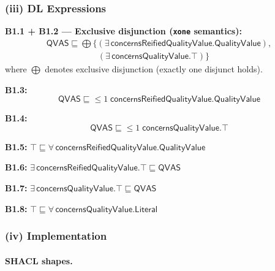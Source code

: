 \documentclass[12pt,a4paper]{article}
\begin{document}
\subsubsection*{(iii) DL Expressions}

\textbf{B1.1 + B1.2 --- Exclusive disjunction (\texttt{xone} semantics):}
\begin{multline*}
  \mathsf{QVAS} \sqsubseteq
  \bigoplus\bigl\{
    (\exists\,\mathsf{concernsReifiedQualityValue}.\mathsf{QualityValue}),\\
    \hspace{6em}(\exists\,\mathsf{concernsQualityValue}.\top)
  \bigr\}
\end{multline*}
where $\bigoplus$ denotes exclusive disjunction (exactly one disjunct holds).

\textbf{B1.3:}
\begin{equation*}
  \mathsf{QVAS} \sqsubseteq {\leq}1\;\mathsf{concernsReifiedQualityValue}.\mathsf{QualityValue}
\end{equation*}

\textbf{B1.4:}
\begin{equation*}
  \mathsf{QVAS} \sqsubseteq {\leq}1\;\mathsf{concernsQualityValue}.\top
\end{equation*}

\textbf{B1.5:}
$\top \sqsubseteq \forall\,\mathsf{concernsReifiedQualityValue}.\mathsf{QualityValue}$

\textbf{B1.6:}
$\exists\,\mathsf{concernsReifiedQualityValue}.\top \sqsubseteq \mathsf{QVAS}$

\textbf{B1.7:}
$\exists\,\mathsf{concernsQualityValue}.\top \sqsubseteq \mathsf{QVAS}$

\textbf{B1.8:}
$\top \sqsubseteq \forall\,\mathsf{concernsQualityValue}.\mathsf{Literal}$

\subsubsection*{(iv) Implementation}

\paragraph{SHACL shapes.}
\end{document}
